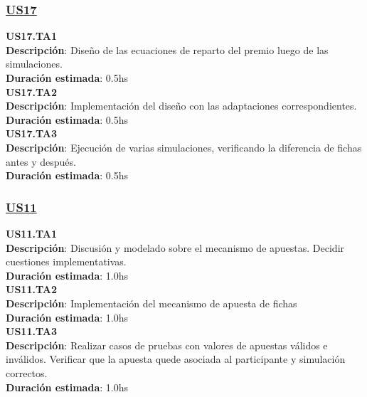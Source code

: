 \begin{tcolorbox}
\subsubsection*{\underline{US17}}
\textbf{US17.TA1} \\
\textbf{Descripción}: Diseño de las ecuaciones de reparto del premio luego de las simulaciones.\\ 
\textbf{Duración estimada}: 0.5hs \\
\newline
\textbf{US17.TA2} \\
\textbf{Descripción}: Implementación del diseño con las adaptaciones correspondientes. \\
\textbf{Duración estimada}: 0.5hs \\
\newline
\textbf{US17.TA3} \\
\textbf{Descripción}: Ejecución de varias simulaciones, verificando la diferencia de fichas antes y después. \\
\textbf{Duración estimada}: 0.5hs 
\end{tcolorbox}
\vspace{10pt}



\begin{tcolorbox}
\subsubsection*{\underline{US11}}
\textbf{US11.TA1} \\
\textbf{Descripción}: Discusión y modelado sobre el mecanismo de apuestas. Decidir cuestiones implementativas.\\
\textbf{Duración estimada}: 1.0hs \\
\newline
\textbf{US11.TA2} \\
\textbf{Descripción}: Implementación del mecanismo de apuesta de fichas \\
\textbf{Duración estimada}: 1.0hs \\
\newline
\textbf{US11.TA3} \\
\textbf{Descripción}: Realizar casos de pruebas con valores de apuestas válidos e inválidos. Verificar que la apuesta quede asociada al participante y simulación correctos.\\
\textbf{Duración estimada}: 1.0hs
\end{tcolorbox}
\vspace{10pt}


